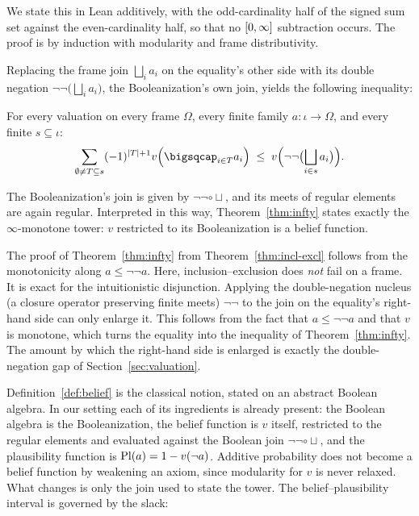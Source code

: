 We state this in Lean additively, with the odd-cardinality half of the
signed sum set against the even-cardinality half, so that no
$[0,\infty]$ subtraction occurs.  The proof is by induction with
modularity and frame distributivity.

Replacing the frame join $\bigsqcup_i a_i$ on the equality's other
side with its double negation $\neg\neg\bigl(\bigsqcup_i a_i\bigr)$, the
Booleanization's own join, yields the following inequality:

\begin{theorem}
\label{thm:infty}
For every valuation on every frame $\Omega$, every finite family
$a : \iota \to \Omega$, and every finite $s \subseteq \iota$:
\[
  \sum_{\emptyset \neq T \subseteq s} (-1)^{|T|+1}
  v\Bigl(\bigsqcap_{i \in T} a_i\Bigr)
  \;\le\;
  v\Bigl(\neg\neg\bigl(\bigsqcup_{i \in s} a_i\bigr)\Bigr).
\]
\end{theorem}

The Booleanization's join is given by
$\neg\neg \circ \sqcup$, and its meets of regular
elements are again regular. Interpreted in this way, 
Theorem~\ref{thm:infty} states exactly
the $\infty$-monotone tower: $v$ restricted to its Booleanization is
a belief function.

The proof of Theorem~\ref{thm:infty} from
Theorem~\ref{thm:incl-excl} follows from the monotonicity along
$a \le \neg\neg a$.
Here, inclusion--exclusion does \emph{not} fail
on a frame.  It is exact for the intuitionistic disjunction.
Applying the double-negation nucleus (a closure operator preserving
finite meets) $\neg\neg$ to the
join on the equality's right-hand side can only enlarge it. This
follows from the fact that
$a \le \neg\neg a$ and that $v$ is monotone, which turns the equality
into the inequality of Theorem~\ref{thm:infty}.  The amount by which
the right-hand side is enlarged is exactly the double-negation gap of
Section~\ref{sec:valuation}.

Definition~\ref{def:belief} is the classical notion, stated on an
abstract Boolean algebra.  In our setting each of its ingredients is
already present: the Boolean algebra is the Booleanization, the
belief function is $v$ itself, restricted to the regular elements and
evaluated against the Boolean join $\neg\neg \circ \sqcup$, and the
plausibility function is $\mathrm{Pl}(a) = 1 - v(\neg a)$.  Additive
probability does not become a belief function by weakening an axiom,
since modularity for $v$ is never relaxed.  What changes is only the
join used to state the tower.  The belief--plausibility interval is
governed by the slack:

